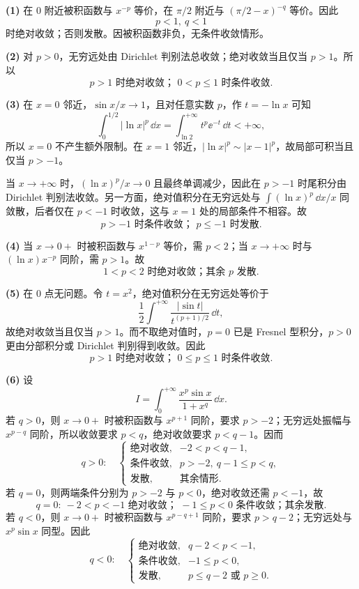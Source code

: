 \begin{xsolution}
\textbf{(1)} 在 $0$ 附近被积函数与 $x^{-p}$ 等价，在 $\pi/2$ 附近与 $(\pi/2-x)^{-q}$ 等价。因此
\[
  \boxed{p<1,\ q<1}
\]
时绝对收敛；否则发散。因被积函数非负，无条件收敛情形。

\textbf{(2)} 对 $p>0$，无穷远处由 Dirichlet 判别法总收敛；绝对收敛当且仅当 $p>1$。所以
\[
  \boxed{p>1\text{ 时绝对收敛； }0<p\leq1\text{ 时条件收敛}.}
\]

\textbf{(3)} 在 $x=0$ 邻近，$\sin x/x\to1$，且对任意实数 $p$，作 $t=-\ln x$ 可知
\[
  \int_0^{1/2}|\ln x|^p\,\dd x
  =\int_{\ln2}^{+\infty}t^p\ee^{-t}\,\dd t<+\infty,
\]
所以 $x=0$ 不产生额外限制。在 $x=1$ 邻近，$|\ln x|^p\sim|x-1|^p$，故局部可积当且仅当 $p>-1$。

当 $x\to+\infty$ 时，$(\ln x)^p/x\to0$ 且最终单调减少，因此在 $p>-1$ 时尾积分由 Dirichlet 判别法收敛。另一方面，绝对值积分在无穷远处与
$\int (\ln x)^p\,\dd x/x$ 同敛散，后者仅在 $p<-1$ 时收敛，这与 $x=1$ 处的局部条件不相容。故
\[
  \boxed{p>-1\text{ 时条件收敛； }p\leq-1\text{ 时发散}.}
\]

\textbf{(4)} 当 $x\to0+$ 时被积函数与 $x^{1-p}$ 等价，需 $p<2$；当 $x\to+\infty$ 时与 $(\ln x)x^{-p}$ 同阶，需 $p>1$。故
\[
  \boxed{1<p<2\text{ 时绝对收敛；其余 }p\text{ 发散}.}
\]

\textbf{(5)} 在 $0$ 点无问题。令 $t=x^2$，绝对值积分在无穷远处等价于
\[
  \frac12\int^{+\infty}\frac{|\sin t|}{t^{(p+1)/2}}\,\dd t,
\]
故绝对收敛当且仅当 $p>1$。而不取绝对值时，$p=0$ 已是 Fresnel 型积分，$p>0$ 更由分部积分或 Dirichlet 判别得到收敛。因此
\[
  \boxed{p>1\text{ 时绝对收敛； }0\leq p\leq1\text{ 时条件收敛}.}
\]

\textbf{(6)} 设
\[
  I=\int_0^{+\infty}\frac{x^p\sin x}{1+x^q}\,\dd x.
\]
若 $q>0$，则 $x\to0+$ 时被积函数与 $x^{p+1}$ 同阶，要求 $p>-2$；无穷远处振幅与 $x^{p-q}$ 同阶，所以收敛要求 $p<q$，绝对收敛要求 $p<q-1$。因而
\[
  \boxed{q>0:\quad
  \begin{cases}
  \text{绝对收敛},&-2<p<q-1,\\
  \text{条件收敛},&p>-2,\ q-1\leq p<q,\\
  \text{发散},&\text{其余情形}.
  \end{cases}}
\]
若 $q=0$，则两端条件分别为 $p>-2$ 与 $p<0$，绝对收敛还需 $p<-1$，故
\[
  \boxed{q=0:\ -2<p<-1\text{ 绝对收敛； }-1\leq p<0\text{ 条件收敛；其余发散}.}
\]
若 $q<0$，则 $x\to0+$ 时被积函数与 $x^{p-q+1}$ 同阶，要求 $p>q-2$；无穷远处与 $x^p\sin x$ 同型。因此
\[
  \boxed{q<0:\quad
  \begin{cases}
  \text{绝对收敛},&q-2<p<-1,\\
  \text{条件收敛},&-1\leq p<0,\\
  \text{发散},&p\leq q-2\text{ 或 }p\geq0.
  \end{cases}}
\]


\end{xsolution}
